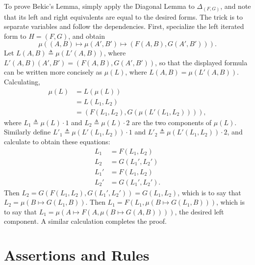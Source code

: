\documentclass[11pt,twoside]{article}
\newcommand{\eqdef}{\mathrel{\triangleq}}
\begin{document}
To prove Bekic's Lemma, simply apply the Diagonal Lemma to $\Delta_{(F,G)}$, and note that its
left and right equivalents are equal to the desired forms.  The trick is to separate
variables and follow the dependencies.  First, specialize the left iterated form to
$H=(F,G)$, and obtain
\begin{displaymath}
  \mu((A,B)\mapsto\mu(A',B')\mapsto(F(A,B),G(A',B'))).
\end{displaymath}
Let $L(A,B)\eqdef\mu(L'(A,B))$, where $L'(A,B)(A',B')=(F(A,B),G(A',B'))$, so that the
displayed formula can be written more concisely as $\mu(L)$, where $L(A,B)=\mu(L'(A,B))$.
Calculating,
\begin{align*}
  \mu(L)
  & = L(\mu(L)) \\
  & = L(L_{1},L_{2}) \\
  & = (F(L_{1},L_{2}),G(\mu(L'(L_{1},L_{2})))),
\end{align*}
where $L_{1}\eqdef \mu(L)\cdot 1$ and $L_{2}\eqdef \mu(L)\cdot 2$ are the two components of
$\mu(L)$.  Similarly define $L'_{1}\eqdef \mu(L'(L_{1},L_{2}))\cdot 1$ and
$L'_{2}\eqdef \mu(L'(L_{1},L_{2}))\cdot 2$, and calculate to obtain these equations:
\begin{align*}
  L_{1}   & = F(L_{1},L_{2}) \\
  L_{2}   & = G(L_{1}',L_{2}') \\
  L_{1}' & = F(L_{1}, L_{2}) \\
  L_{2}' & = G(L_{1}',L_{2}').
\end{align*}
Then $L_{2} = G(F(L_{1},L_{2}),G(L_{1}',L_{2}')) = G(L_{1},L_{2})$, which is to say that
$L_{2}=\mu(B\mapsto G(L_{1},B))$.  Then $L_{1} = F(L_{1}, \mu(B\mapsto G(L_{1},B)))$, which is to say that
$L_{1}=\mu(A\mapsto F(A,\mu(B\mapsto G(A,B))))$, the desired left component.  A similar calculation
completes the proof.

\section{Assertions and Rules}
\end{document}
